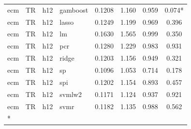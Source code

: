 \begin{ThreePartTable}
\begin{longtable}[t]{llclcccc}
ecm & TR & h12 & gamboost & 0.1208 & 1.160 & 0.959 & 0.074*\\
ecm & TR & h12 & lasso & 0.1249 & 1.199 & 0.969 & 0.396\\
ecm & TR & h12 & lm & 0.1630 & 1.565 & 0.999 & 0.350\\
ecm & TR & h12 & pcr & 0.1280 & 1.229 & 0.983 & 0.931\\
ecm & TR & h12 & ridge & 0.1203 & 1.156 & 0.949 & 0.321\\
ecm & TR & h12 & sp & 0.1096 & 1.053 & 0.714 & 0.178\\
ecm & TR & h12 & spi & 0.1202 & 1.154 & 0.893 & 0.457\\
ecm & TR & h12 & svmlw2 & 0.1171 & 1.124 & 0.937 & 0.921\\
ecm & TR & h12 & svmr & 0.1182 & 1.135 & 0.988 & 0.562\\*
\end{longtable}
\end{ThreePartTable}
\endgroup{}
